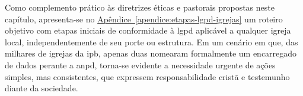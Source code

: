 Como complemento prático às diretrizes éticas e pastorais propostas neste capítulo, apresenta-se no \hyperref[apendice:etapas-lgpd-igrejas]{Apêndice~\ref*{apendice:etapas-lgpd-igrejas}} um roteiro objetivo com etapas iniciais de conformidade à \gls{lgpd} aplicável a qualquer igreja local, independentemente de seu porte ou estrutura. Em um cenário em que, das milhares de igrejas da \gls{ipb}, apenas duas nomearam formalmente um encarregado de dados perante a \gls{anpd}, torna-se evidente a necessidade urgente de ações simples, mas consistentes, que expressem responsabilidade cristã e testemunho diante da sociedade.
